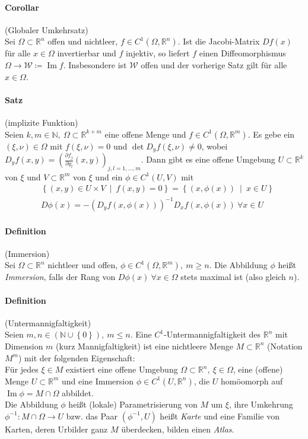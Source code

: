 \documentclass[12pt,a4paper,fleqn]{article}
\DeclareMathOperator{\im}{Im}
\def\set#1{{\left\{ #1 \right\}}}
\def\Mid{\ \middle|\ }
\def\R{{\mathbb{R}}}
\begin{document}
\paragraph{Corollar} (Globaler Umkehrsatz)\\
Sei $\Omega \subset \R^n$ offen und nichtleer, $f \in C^1 (\Omega, \R^n)$. Ist die Jacobi-Matrix $Df(x)$ für alle $x \in \Omega$ invertierbar und $f$ injektiv, so liefert $f$ einen Diffeomorphismus $\Omega \rightarrow \mathcal{W} \coloneqq \im f$. Insbesondere ist $\mathcal{W}$ offen und der vorherige Satz gilt für alle $x \in \Omega$.

\paragraph{Satz} (implizite Funktion)\\
Seien $k, m \in \mathbb{N},\ \Omega \subset \R^{k+m}$ eine offene Menge und $f \in C^1(\Omega, \R^m)$. Es gebe ein \mbox{$(\xi, \nu) \in \Omega$} mit $f(\xi, \nu) = 0$ und $\det D_yf(\xi, \nu) \not = 0$, wobei $D_yf(x, y) = \left(\frac{\partial f_j}{\partial y_l}(x, y)\right)_{j, l = 1, \dots, m}$. Dann gibt es eine offene Umgebung $U \subset \R^k$ von $\xi$ und $V \subset \R^m$ von $\xi$ und ein $\phi \in C^1(U, V)$ mit 
\begin{align*}
&\set{(x, y) \in U \times V \Mid f(x, y) = 0} = \set{(x, \phi(x)) \Mid x \in U}\\
&D\phi(x) = -(D_yf(x, \phi(x)))^{-1} D_xf(x, \phi(x))\ \forall x \in U
\end{align*}

\paragraph{Definition} (Immersion)\\
Sei $\Omega \subset \R^n$ nichtleer und offen, $\phi \in C^1(\Omega, \R^m),\ m \geq n$. Die Abbildung $\phi$ heißt \textit{Immersion}, falls der Rang von $D\phi(x)\ \forall x \in \Omega$ stets maximal ist (also gleich $n$).

\paragraph{Definition} (Untermannigfaltigkeit)\\
Seien $m, n \in (\mathbb{N} \cup \set{0}),\ m \leq n$. Eine $C^1$-Untermannigfaltigkeit des $\R^n$ mit Dimension $m$ (kurz Mannigfaltigkeit) ist eine nichtleere Menge $M \subset \R^n$ (Notation $M^m$) mit der folgenden Eigenschaft:\\
Für jedes $\xi \in M$ existiert eine offene Umgebung $\Omega \subset \R^n,\ \xi \in \Omega$, eine (offene) Menge $U \subset \R^m$ und eine Immersion $\phi \in C^1(U, \R^n)$, die $U$ homöomorph auf $\im \phi  = M \cap \Omega$ abbildet.\\
Die Abbildung $\phi$ heißt (lokale) Parametrisierung von $M$ um $\xi$, ihre Umkehrung $\phi^{-1}\colon M \cap \Omega \rightarrow U$ bzw. das Paar $(\phi^{-1}, U)$ heißt \textit{Karte} und eine Familie von Karten, deren Urbilder ganz $M$ überdecken, bilden einen \textit{Atlas}.
\end{document}
